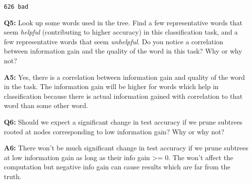 \documentclass[11pt]{article}
\begin{document}
    \begin{Verbatim}[commandchars=\\\{\}]
626 bad

    \end{Verbatim}

    \textbf{Q5:} Look up some words used in the tree. Find a few
representative words that seem \emph{helpful} (contributing to higher
accuracy) in this classification task, and a few representative words
that seem \emph{unhelpful}. Do you notice a correlation between
information gain and the quality of the word in this task? Why or why
not?

    \textbf{A5:} Yes, there is a correlation between information gain and
quality of the word in the task. The information gain will be higher for
words which help in classification because there is actual information
gained with correlation to that word than some other word.

    \textbf{Q6:} Should we expect a significant change in test accuracy if
we prune subtrees rooted at nodes corresponding to low information gain?
Why or why not?

    \textbf{A6:} There won't be much significant change in test accuracy if
we prune subtrees at low information gain as long as their info gain
\textgreater{}= 0. The won't affect the computation but negative info
gain can cause results which are far from the truth.


    
    
    
    
\end{document}
